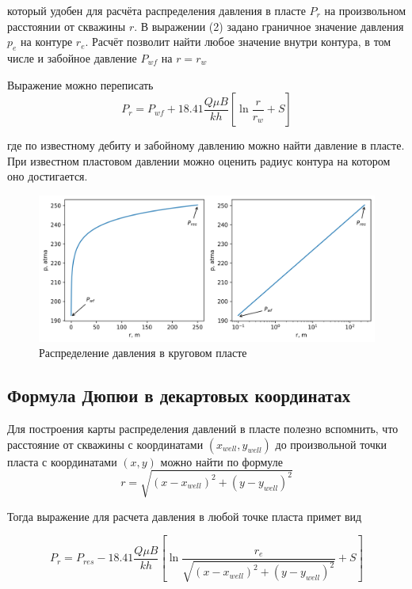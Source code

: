 который удобен для расчёта распределения давления в пласте $P_r$ на произвольном расстоянии от скважины $r$.
В выражении (2) задано граничное значение давления $p_e$ на контуре $r_e$. Расчёт позволит найти любое значение внутри контура, в том числе и забойное давление $P_{wf}$ на $r=r_w$

Выражение можно переписать 
\begin{equation}
	P_{r} = P_{wf} + 18.41\dfrac{ Q\mu B }{kh} \left[ \ln\dfrac{r}{r_w} +S \right]
\end{equation}

где по известному дебиту и забойному давлению можно найти давление в пласте. При известном пластовом давлении можно оценить радиус контура на котором оно достигается.

\begin{figure}[h!]
	\begin{center}
		\includegraphics[width=12cm]{pics/stac_pressure_dist_1.png}
		\caption{Распределение давления в круговом пласте}
		\label{ris:stac_pressure_dist_1}
	\end{center}
\end{figure}

\subsection{Формула Дюпюи в декартовых координатах}
Для построения карты распределения давлений в пласте полезно вспомнить, что расстояние от скважины с координатами $(x_{well}, y_{well})$ до произвольной точки пласта с координатами $(x,y)$ можно найти по формуле 
$$r=\sqrt{ (x-x_{well})^2 + (y-y_{well})^2 }$$

Тогда выражение для расчета давления в любой точке пласта примет вид

\begin{equation}
	P_{r} = P_{res} - 18.41\dfrac{ Q\mu B }{kh} \left[ \ln\dfrac{r_e}{\sqrt{ (x-x_{well})^2 + (y-y_{well})^2 }} +S \right]
\end{equation}

